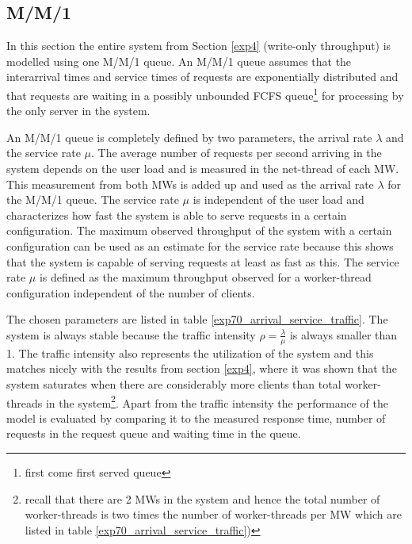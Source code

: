 \documentclass[report.tex]{subfiles}
\begin{document}
\subsection{M/M/1}

In this section the entire system from Section \ref{exp4} (write-only throughput) is modelled using one M/M/1 queue. An M/M/1 queue assumes that the interarrival times and service times of requests are exponentially distributed and that requests are waiting in a possibly unbounded FCFS queue\footnote{first come first served queue} for processing by the only server in the system.

An M/M/1 queue is completely defined by two parameters, the arrival rate $\lambda$ and the service rate $\mu$.
The average number of requests per second arriving in the system depends on the user load and is measured in the net-thread of each MW. This measurement from both MWs is added up and used as the arrival rate $\lambda$ for the M/M/1 queue.
The service rate $\mu$ is independent of the user load and characterizes how fast the system is able to serve requests in a certain configuration.
The maximum observed throughput of the system with a certain configuration can be used as an estimate for the service rate because this shows that the system is capable of serving requests at least as fast as this. 
The service rate $\mu$ is defined as the maximum throughput observed for a worker-thread configuration independent of the number of clients.

The chosen parameters are listed in table \ref{exp70_arrival_service_traffic}.
The system is always stable because the traffic intensity  $\rho= \frac{\lambda}{\mu}$ is always smaller than 1.
The traffic intensity also represents the utilization of the system and this matches nicely with the results from section \ref{exp4}, where it was shown that the system saturates when there are considerably more clients than total worker-threads in the system\footnote{recall that there are 2 MWs in the system and hence the total number of worker-threads is two times the number of worker-threads per MW which are listed in table \ref{exp70_arrival_service_traffic})}.
Apart from the traffic intensity the performance of the model is evaluated by comparing it to the measured response time, number of requests in the request queue and waiting time in the queue.
\end{document}

